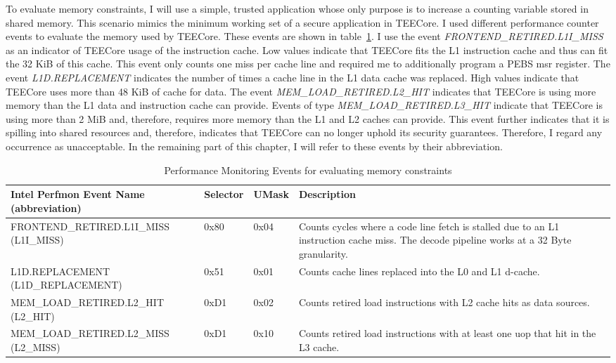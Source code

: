 To evaluate memory constraints, I will use a simple, trusted application whose
only purpose is to increase a counting variable stored in shared memory. This
scenario mimics the minimum working set of a secure application in TEECore. I
used different performance counter events to evaluate the memory used by
TEECore. These events are shown in table~\ref{50:tab:events}. I use the event
\textit{FRONTEND\_RETIRED.L1I\_MISS} as an indicator of TEECore usage of the
instruction cache. Low values indicate that TEECore fits the L1 instruction
cache and thus can fit the 32 KiB of this cache. This event only counts one miss
per cache line and required me to additionally program a PEBS \gls{msr}
register. The event \textit{L1D.REPLACEMENT} indicates the number of times a
cache line in the L1 data cache was replaced. High values indicate that TEECore
uses more than 48 KiB of cache for data. The event
\textit{MEM\_LOAD\_RETIRED.L2\_HIT} indicates that TEECore is using more memory
than the L1 data and instruction cache can provide. Events of type
\textit{MEM\_LOAD\_RETIRED.L3\_HIT} indicate that TEECore is using more than 2
MiB and, therefore, requires more memory than the L1 and L2 caches can provide.
This event further indicates that it is spilling into shared resources and,
therefore, indicates that TEECore can no longer uphold its security guarantees.
Therefore, I regard any occurrence as unacceptable. In the remaining part of
this chapter, I will refer to these events by their abbreviation.

\begin{table}[ht]
  \centering
  \begin{tabular}{ |p{6cm}|p{1.35cm}|p{1.25cm}|p{4cm}|}
    \hline
    \makecell[l]{Intel Perfmon Event Name \\ (abbreviation)} & Selector & UMask & Description                                                                      \\
    \hline
    \makecell[l]{FRONTEND\_RETIRED.L1I\_MISS\\ (L1I\_MISS)}  & 0x80     & 0x04  & Counts cycles where a code line fetch is stalled due to an L1 instruction cache miss. The decode pipeline works at a 32 Byte granularity. \\
    \makecell[l]{L1D.REPLACEMENT \\ (L1D\_REPLACEMENT)}      & 0x51     & 0x01  & Counts cache lines replaced into the L0 and L1 d-cache.                          \\
    MEM\_LOAD\_RETIRED.L2\_HIT (L2\_HIT)                     & 0xD1     & 0x02  & Counts retired load instructions with L2 cache hits as data sources.             \\
    MEM\_LOAD\_RETIRED.L2\_MISS (L2\_MISS)                   & 0xD1     & 0x10  & Counts retired load instructions with at least one uop that hit in the L3 cache. \\
    \hline
  \end{tabular}
  \caption{Performance Monitoring Events for evaluating memory constraints}
  \label{50:tab:events}
\end{table}

